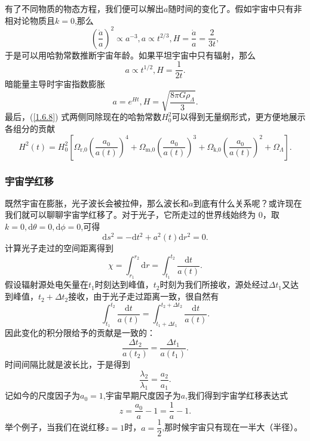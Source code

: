 \documentclass[../天体物理基础.tex]{subfiles}
\begin{document}
有了不同物质的物态方程，我们便可以解出$a$随时间的变化了。假如宇宙中只有非相对论物质且$k=0$,那么
\begin{equation}
\left(\frac{\dot{a}}{a}\right)^{2}\propto{}a^{-3},a\propto{}t^{2/3},H=\frac{\dot{a}}{a}=\frac{2}{3t},
\end{equation}
于是可以用哈勃常数推断宇宙年龄。如果平坦宇宙中只有辐射，那么
\begin{equation}
a\propto{}t^{1/2},H=\frac{1}{2t}.
\end{equation}
暗能量主导时宇宙指数膨胀
\begin{equation}
a=e^{Ht},H=\sqrt{\frac{8\pi G\rho_{\Lambda}}{3}}.
\end{equation}
最后，(\ref{1.6.8}) 式两侧同除现在的哈勃常数$H_{0}^{2}$可以得到无量纲形式，更方便地展示各组分的贡献
\begin{equation}
H^{2}\left(t\right)=H_{0}^{2}\left[\Omega_{\text{r,0}}\left(\frac{a_{0}}{a\left(t\right)}\right)^{4}+\Omega_{\text{m,0}}\left(\frac{a_{0}}{a\left(t\right)}\right)^{3}+\Omega_{\text{k,0}}\left(\frac{a_{0}}{a\left(t\right)}\right)^{2}+\Omega_{\Lambda}\right].
\end{equation}

\subsubsection{宇宙学红移}
既然宇宙在膨胀，光子波长会被拉伸，那么波长和$a$到底有什么关系呢？或许现在我们就可以聊聊宇宙学红移了。对于光子，它所走过的世界线始终为 0，取$k=0,\mathrm{d}\theta=0,\mathrm{d}\phi=0$,可得
\begin{equation}
\mathrm{d}s^{2}=-\mathrm{d}t^{2}+a^{2}\left(t\right)\mathrm{d}r^{2}=0.
\end{equation}
计算光子走过的空间距离得到
\begin{equation}
\chi=\int_{r_{1}}^{r_{2}}\mathrm{d}r=\int_{t_{1}}^{t_{2}}\frac{\mathrm{d}t}{a\left(t\right)}.
\end{equation}
假设辐射源处电矢量在$t_{1}$时刻达到峰值，$t_{2}$时刻为我们所接收，源处经过$\Delta{}t_{1}$又达到峰值，$t_{2}+\Delta{}t_{2}$接收，由于光子走过距离一致，很自然有
\begin{equation}
\int_{t_{1}}^{t_{2}}\frac{\mathrm{d}t}{a\left(t\right)}=\int_{t_{1}+\Delta{}t_{1}}^{t_{2}+\Delta{}t_{2}}\frac{\mathrm{d}t}{a\left(t\right)}.
\end{equation}
因此变化的积分限给予的贡献是一致的：
\begin{equation}
\frac{\Delta{}t_{2}}{a\left(t_{2}\right)}=\frac{\Delta{}t_{1}}{a\left(t_{1}\right)}.
\end{equation}
时间间隔比就是波长比，于是得到
\begin{equation}
\frac{\lambda_{2}}{\lambda_{1}}=\frac{a_{2}}{a_{1}}.
\end{equation}
记如今的尺度因子为$a_{0}=1$,宇宙早期尺度因子为$a$,我们得到宇宙学红移表达式
\begin{equation}
z=\frac{a_{0}}{a}-1=\frac{1}{a}-1.
\end{equation}
举个例子，当我们在说红移$z=1$时，$a=\dfrac12$,那时候宇宙只有现在一半大（半径）。
\end{document}
